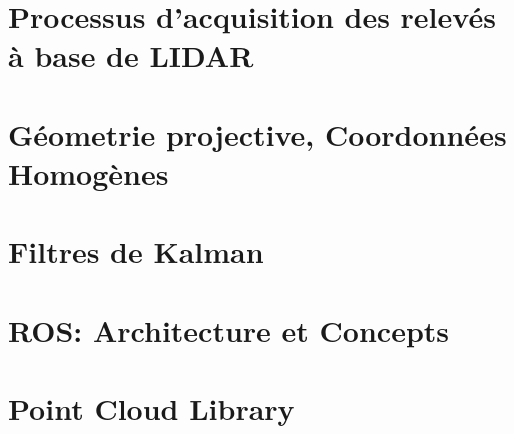 \documentclass[12pt,a4paper]{report}
\begin{document}
\chapter{Processus d'acquisition des relevés à base de LIDAR}

\begin{appendix}
	\chapter{Géometrie projective, Coordonnées Homogènes}
	
	\chapter{Filtres de Kalman}
	
	\chapter{ROS: Architecture et Concepts}
	
	\chapter{Point Cloud Library}

\end{appendix}



\end{document}
